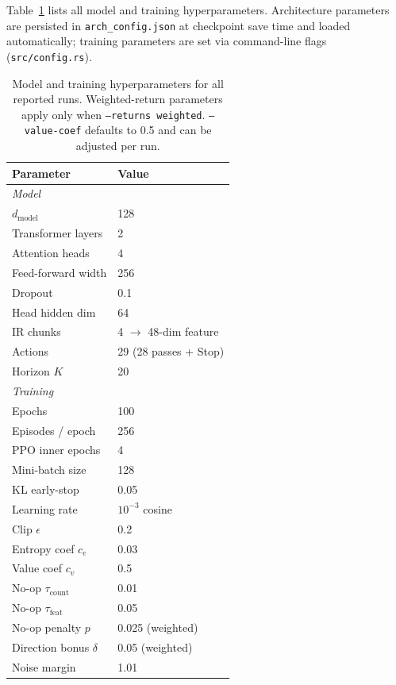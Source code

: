 \documentclass[conference]{IEEEtran}
\begin{document}
Table~\ref{tab:hparams} lists all model and training hyperparameters.
Architecture parameters are persisted in \texttt{arch\_config.json} at
checkpoint save time and loaded automatically; training parameters are set
via command-line flags (\texttt{src/config.rs}).

\begin{table}[t]
\caption{Model and training hyperparameters for all reported runs.
Weighted-return parameters apply only when \texttt{--returns weighted}.
\texttt{--value-coef} defaults to 0.5 and can be adjusted per run.}
\label{tab:hparams}
\centering
\begin{tabular}{ll}
\toprule
Parameter & Value \\
\midrule
\multicolumn{2}{l}{\emph{Model}} \\
$d_{\text{model}}$ & 128 \\
Transformer layers & 2 \\
Attention heads & 4 \\
Feed-forward width & 256 \\
Dropout & 0.1 \\
Head hidden dim & 64 \\
IR chunks & 4 $\to$ 48-dim feature \\
Actions & 29 (28 passes + Stop) \\
Horizon $K$ & 20 \\
\midrule
\multicolumn{2}{l}{\emph{Training}} \\
Epochs & 100 \\
Episodes / epoch & 256 \\
PPO inner epochs & 4 \\
Mini-batch size & 128 \\
KL early-stop & 0.05 \\
Learning rate & $10^{-3}$ cosine \\
Clip $\epsilon$ & 0.2 \\
Entropy coef $c_e$ & 0.03 \\
Value coef $c_v$ & 0.5 \\
No-op $\tau_{\text{count}}$ & 0.01 \\
No-op $\tau_{\text{feat}}$ & 0.05 \\
No-op penalty $p$ & 0.025 (weighted) \\
Direction bonus $\delta$ & 0.05 (weighted) \\
Noise margin & 1.01 \\
\bottomrule
\end{tabular}
\end{table}
\end{document}
